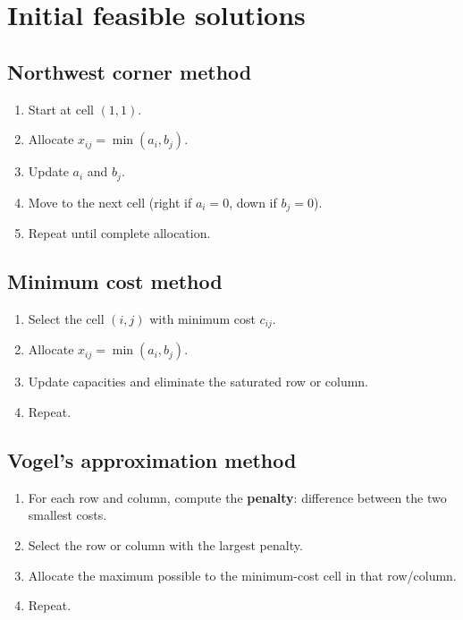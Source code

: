 \section{Initial feasible solutions}

\subsection{Northwest corner method}

\begin{algorithme}[title=\textbf{Northwest corner}]
\begin{enumerate}
  \item Start at cell $(1,1)$.
  \item Allocate $x_{ij} = \min(a_i, b_j)$.
  \item Update $a_i$ and $b_j$.
  \item Move to the next cell (right if $a_i = 0$, down if $b_j = 0$).
  \item Repeat until complete allocation.
\end{enumerate}
\end{algorithme}

\subsection{Minimum cost method}

\begin{algorithme}[title=\textbf{Minimum cost}]
\begin{enumerate}
  \item Select the cell $(i,j)$ with minimum cost $c_{ij}$.
  \item Allocate $x_{ij} = \min(a_i, b_j)$.
  \item Update capacities and eliminate the saturated row or column.
  \item Repeat.
\end{enumerate}
\end{algorithme}

\subsection{Vogel's approximation method}

\begin{algorithme}[title=\textbf{Vogel's Approximation Method (VAM)}]
\begin{enumerate}
  \item For each row and column, compute the \textbf{penalty}: difference
        between the two smallest costs.
  \item Select the row or column with the largest penalty.
  \item Allocate the maximum possible to the minimum-cost cell in that
        row/column.
  \item Repeat.
\end{enumerate}
\end{algorithme}

